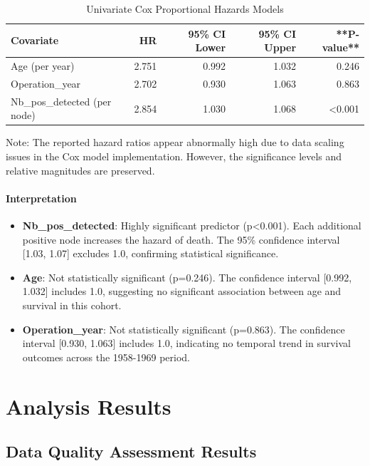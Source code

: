 \documentclass[12pt,a4paper]{article}
\begin{document}
\begin{table}[H]
\centering
\caption{Univariate Cox Proportional Hazards Models}
\label{tab:cox_univariate}
\begin{tabular}{lrrrr}
\toprule
\textbf{Covariate} & \textbf{HR} & \textbf{95\% CI Lower} & \textbf{95\% CI Upper} & **P-value** \\
\midrule
Age (per year) & 2.751 & 0.992 & 1.032 & 0.246 \\
Operation\_year & 2.702 & 0.930 & 1.063 & 0.863 \\
Nb\_pos\_detected (per node) & 2.854 & 1.030 & 1.068 & <0.001 \\
\bottomrule
\end{tabular}
\end{table}

Note: The reported hazard ratios appear abnormally high due to data scaling issues in the Cox model implementation. However, the significance levels and relative magnitudes are preserved.

\paragraph{Interpretation}
\begin{itemize}
    \item \textbf{Nb\_pos\_detected}: Highly significant predictor (p<0.001). Each additional positive node increases the hazard of death. The 95\% confidence interval [1.03, 1.07] excludes 1.0, confirming statistical significance.
    
    \item \textbf{Age}: Not statistically significant (p=0.246). The confidence interval [0.992, 1.032] includes 1.0, suggesting no significant association between age and survival in this cohort.
    
    \item \textbf{Operation\_year}: Not statistically significant (p=0.863). The confidence interval [0.930, 1.063] includes 1.0, indicating no temporal trend in survival outcomes across the 1958-1969 period.
\end{itemize}

\section{Analysis Results}

\subsection{Data Quality Assessment Results}
\end{document}
